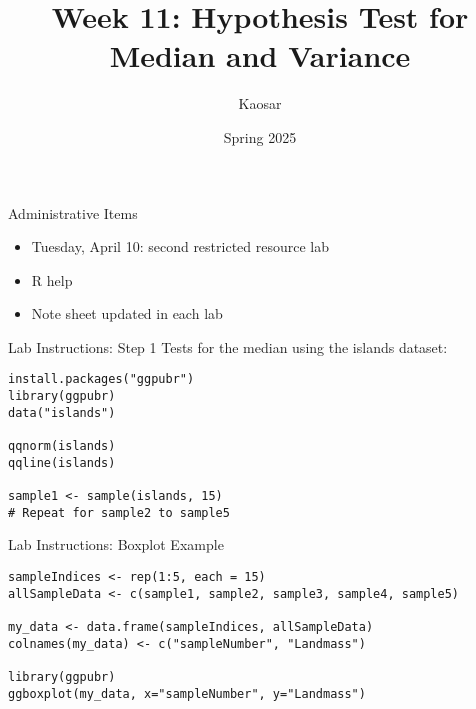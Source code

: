 \documentclass{beamer}
\title{Week 11: Hypothesis Test for Median and Variance}
\author{Kaosar}
\institute{Auburn University}
\date{Spring 2025}
\begin{document}
\begin{frame}
\titlepage
\end{frame}

\begin{frame}{Administrative Items}
\begin{itemize}
    \item Tuesday, April 10: second restricted resource lab
    \item R help
    \item Note sheet updated in each lab
\end{itemize}
\end{frame}

\begin{frame}[fragile]{Lab Instructions: Step 1}
Tests for the median using the islands dataset:
\begin{verbatim}
install.packages("ggpubr")
library(ggpubr)
data("islands")

qqnorm(islands)
qqline(islands)

sample1 <- sample(islands, 15)
# Repeat for sample2 to sample5
\end{verbatim}
\end{frame}

\begin{frame}[fragile]{Lab Instructions: Boxplot Example}
\begin{verbatim}
sampleIndices <- rep(1:5, each = 15)
allSampleData <- c(sample1, sample2, sample3, sample4, sample5)

my_data <- data.frame(sampleIndices, allSampleData)
colnames(my_data) <- c("sampleNumber", "Landmass")

library(ggpubr)
ggboxplot(my_data, x="sampleNumber", y="Landmass")
\end{verbatim}
\end{frame}
\end{document}
